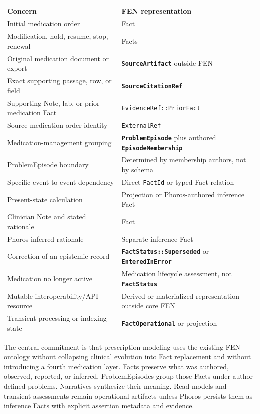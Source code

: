 \documentclass[11pt]{article}
\newcommand{\entity}[1]{\texttt{\textbf{#1}}}
\newcommand{\field}[1]{\texttt{#1}}
\begin{document}
\begin{center}
\footnotesize
\renewcommand{\arraystretch}{1.08}
\begin{tabular}{>{\raggedright\arraybackslash}p{5.0cm} >{\raggedright\arraybackslash}p{8.0cm}}
\toprule
\textbf{Concern} & \textbf{FEN representation} \\
\midrule
Initial medication order & Fact \\
Modification, hold, resume, stop, renewal & Facts \\
Original medication document or export & \entity{SourceArtifact} outside FEN \\
Exact supporting passage, row, or field & \entity{SourceCitationRef} \\
Supporting Note, lab, or prior medication Fact & \field{EvidenceRef::PriorFact} \\
Source medication-order identity & \field{ExternalRef} \\
Medication-management grouping & \entity{ProblemEpisode} plus authored \entity{EpisodeMembership} \\
ProblemEpisode boundary & Determined by membership authors, not by schema \\
Specific event-to-event dependency & Direct \field{FactId} or typed Fact relation \\
Present-state calculation & Projection or Phoros-authored inference Fact \\
Clinician Note and stated rationale & Fact \\
Phoros-inferred rationale & Separate inference Fact \\
Correction of an epistemic record & \entity{FactStatus::Superseded} or \entity{EnteredInError} \\
Medication no longer active & Medication lifecycle assessment, not \entity{FactStatus} \\
Mutable interoperability/API resource & Derived or materialized representation outside core FEN \\
Transient processing or indexing state & \entity{FactOperational} or projection \\
\bottomrule
\end{tabular}
\end{center}

{\small The central commitment is that prescription modeling uses the existing FEN
ontology without collapsing clinical evolution into Fact replacement and
without introducing a fourth medication layer. Facts preserve what was
authored, observed, reported, or inferred. ProblemEpisodes group those Facts
under author-defined problems. Narratives synthesize their meaning. Read
models and transient assessments remain operational artifacts unless Phoros
persists them as inference Facts with explicit assertion metadata and evidence.}
\end{document}

